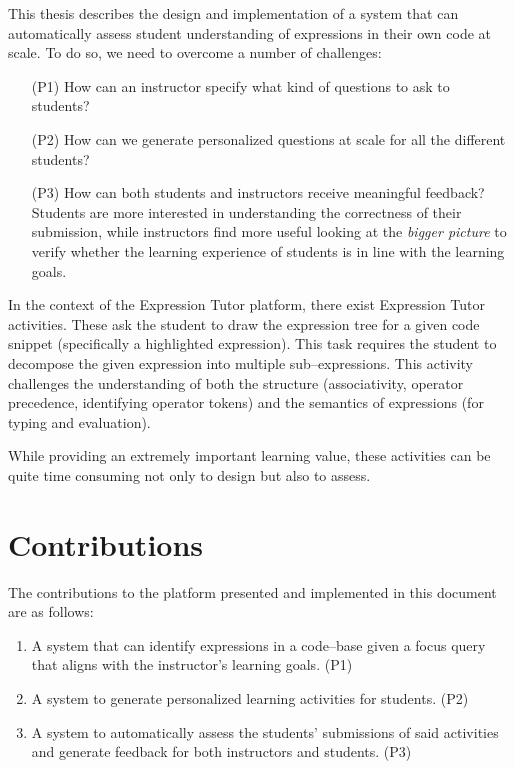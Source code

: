 \begin{chapterBody}
This thesis describes the design and implementation of a system that can
automatically assess student understanding of expressions in their own
code at scale. To do so, we need to overcome a number of challenges:

\begin{itemize}
    \item[(P1)] How can an instructor specify what kind of questions to ask to
students?
    \item[(P2)] How can we generate personalized questions at scale for all the 
different students?
    \item[(P3)] How can both students and instructors receive meaningful feedback?
Students are more interested in understanding the correctness of their
submission, while instructors find more useful looking at the \textit{bigger 
picture} to verify whether the learning experience of students is in line with
the learning goals.
\end{itemize}

In the context of the Expression Tutor platform, there exist Expression Tutor
activities. These ask the student to draw the expression tree for a given code
snippet (specifically a highlighted expression).
This task requires the student to decompose the given expression into
multiple sub–expressions. This activity challenges the understanding of both the
structure (associativity, operator precedence, identifying operator tokens) and 
the semantics of expressions (for typing and evaluation).

While providing an extremely important learning value, these activities can be
quite time consuming not only to design but also to assess.

\section{Contributions}\label{sec:intro-contrib}

The contributions to the platform presented and implemented in this document
are as follows:

\begin{enumerate}
    \item A system that can identify expressions in a code–base given a focus
query that aligns with the instructor's learning goals. (P1)
    \item A system to generate personalized learning activities for
students. (P2)
    \item A system to automatically assess the students' submissions of said
activities and generate feedback for both instructors and students. (P3)
\end{enumerate}


\end{chapterBody}
